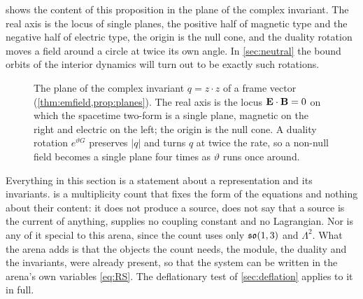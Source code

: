  shows the content of this proposition in the plane of the complex invariant. The real axis is the locus of single
planes, the positive half of magnetic type and the negative half of electric type, the origin is the null cone, and the duality
rotation moves a field around a circle at twice its own angle. In \cref{sec:neutral} the bound orbits of the interior dynamics will
turn out to be exactly such rotations.

\begin{figure}[t]
\centering
{}
\caption{The plane of the complex invariant $q=z\cdot z$ of a frame vector (\cref{thm:emfield,prop:planes}). The real axis is the
locus $\mathbf E\cdot\mathbf B=0$ on which the spacetime two-form is a single plane, magnetic on the right and electric on the left; the origin is
the null cone. A duality rotation $e^{\vartheta G}$ preserves $|q|$ and turns $q$ at twice the rate, so a non-null field becomes a single
plane four times as $\vartheta$ runs once around.}
\label{fig:qplane}
\end{figure}

Everything in this section is a statement about a representation and its invariants.  is a multiplicity count that
fixes the form of the equations and nothing about their content: it does not produce a source, does not say that a source is the
current of anything, supplies no coupling constant and no Lagrangian. Nor is any of it special to this arena, since the count uses only
$\mathfrak{so}(1,3)$ and $\Lambda^2$. What the arena adds is that the objects the count needs, the module, the duality and the invariants, were
already present, so that the system can be written in the arena's own variables \eqref{eq:RS}. The deflationary test of
\cref{sec:deflation} applies to it in full.

